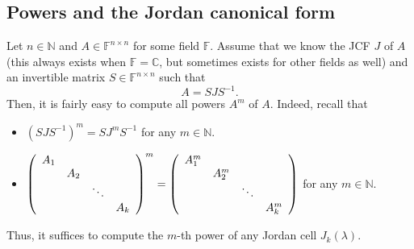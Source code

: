 \documentclass[numbers=enddot,12pt,final,onecolumn,notitlepage]{scrartcl}%
\numberwithin{exer}{subsection}
\theoremstyle{definition}
\begin{document}
\subsection{Powers and the Jordan canonical form}

Let $n\in\mathbb{N}$ and $A\in\mathbb{F}^{n\times n}$ for some field
$\mathbb{F}$. Assume that we know the JCF $J$ of $A$ (this always exists when
$\mathbb{F}=\mathbb{C}$, but sometimes exists for other fields as well) and an
invertible matrix $S\in\mathbb{F}^{n\times n}$ such that
\[
A=SJS^{-1}.
\]
Then, it is fairly easy to compute all powers $A^{m}$ of $A$. Indeed, recall that

\begin{itemize}
\item $\left(  SJS^{-1}\right)  ^{m}=SJ^{m}S^{-1}$ for any $m\in\mathbb{N}$.

\item $\left(
\begin{array}
[c]{cccc}%
A_{1} &  &  & \\
& A_{2} &  & \\
&  & \ddots & \\
&  &  & A_{k}%
\end{array}
\right)  ^{m}=\left(
\begin{array}
[c]{cccc}%
A_{1}^{m} &  &  & \\
& A_{2}^{m} &  & \\
&  & \ddots & \\
&  &  & A_{k}^{m}%
\end{array}
\right)  $ for any $m\in\mathbb{N}$.
\end{itemize}

Thus, it suffices to compute the $m$-th power of any Jordan cell $J_{k}\left(
\lambda\right)  $.
\end{document}
